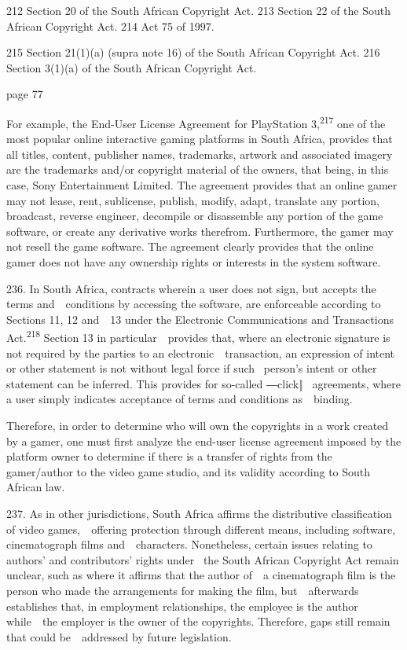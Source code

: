 \documentclass[
]{article}
\begin{document}
{212 }{Section 20 of the South African }{Copyright Act}{. }{213
}{Section 22 of the South African }{Copyright Act}{. }{214 }{Act 75 of
1997.}

{215 }{Section 21(1)(a) }{(supra }{note 16) of the South African
}{Copyright Act}{. }{216 }{Section 3(1)(a) of the South African
}{Copyright Act}{.}

{page 77}

{For example, the End-User License Agreement for PlayStation
3,}\textsuperscript{{217 }}{one of the most popular online interactive
gaming platforms in South Africa, provides that all titles, content,
publisher names, trademarks, artwork and associated imagery are the
trademarks and/or copyright material of the owners, that being, in this
case, Sony Entertainment Limited. The agreement provides that an online
gamer may not lease, rent, sublicense, publish, modify, adapt, translate
any portion, broadcast, reverse engineer, decompile or disassemble any
portion of the game software, or create any derivative works therefrom.
Furthermore, the gamer may not resell the game software. The agreement
clearly provides that the online gamer does not have any ownership
rights or interests in the system software.}

{236. }{In South Africa, contracts wherein a user does not sign, but
accepts the terms and~~conditions by accessing the software, are
enforceable according to Sections 11, 12 and~~13 under the }{Electronic
Communications and Transactions Act.}\textsuperscript{{218 }}{Section 13
in particular~~provides that, where an electronic signature is not
required by the parties to an electronic~~transaction, an expression of
intent or other statement is not without legal force if such }{~person's
intent or other statement can be inferred}{. This provides for
so-}{called ―click‖ }{~agreements, where a user simply indicates
acceptance of terms and conditions as~~binding.}

{Therefore, in order to determine who will own the copyrights in a work
created by a gamer, one must first analyze the end-user license
agreement imposed by the platform owner to determine if there is a
transfer of rights from the gamer/author to the video game studio, and
its validity according to South African law.}

{237. }{As in other jurisdictions, South Africa affirms the distributive
classification of video games,~~offering protection through different
means, including software, cinematograph films and~~characters.
}{Nonetheless, certain issues relating to authors' and contributors'
rights under }{~the South African }{Copyright Act }{remain unclear, such
as where it affirms that the author of~~a cinematograph film is the
person who made the arrangements for making the film, but~~afterwards
establishes that, in employment relationships, the employee is the
author while~~the employer is the owner of the copyrights. Therefore,
gaps still remain that could be~~addressed by future legislation.}
\end{document}
